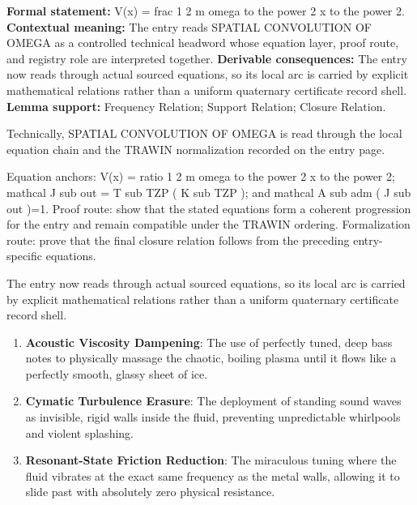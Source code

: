 \begingroup\footnotesize\setlength{\emergencystretch}{3em}\sloppy
\textbf{Formal statement:} V(x) = frac 1 2 m omega to the power 2 x to the power 2. \textbf{Contextual meaning:} The entry reads SPATIAL CONVOLUTION OF OMEGA as a controlled technical headword whose equation layer, proof route, and registry role are interpreted together. \textbf{Derivable consequences:} The entry now reads through actual sourced equations, so its local arc is carried by explicit mathematical relations rather than a uniform quaternary certificate record shell. \textbf{Lemma support:} Frequency Relation; Support Relation; Closure Relation.\par
\endgroup

Technically, SPATIAL CONVOLUTION OF OMEGA is read through the local equation chain and the TRAWIN normalization recorded on the entry page.

Equation anchors: V(x) = ratio 1 2 m omega to the power 2 x to the power 2; mathcal J sub out = T sub TZP ( K sub TZP ); and mathcal A sub adm ( J sub out )=1. Proof route: show that the stated equations form a coherent progression for the entry and remain compatible under the TRAWIN ordering. Formalization route: prove that the final closure relation follows from the preceding entry-specific equations.

The entry now reads through actual sourced equations, so its local arc is carried by explicit mathematical relations rather than a uniform quaternary certificate record shell.
\endgroup

\begin{enumerate}[leftmargin=1.6em,itemsep=6pt,topsep=4pt]
\item \textbf{Acoustic Viscosity Dampening}: The use of perfectly tuned, deep bass notes to physically massage the chaotic, boiling plasma until it flows like a perfectly smooth, glassy sheet of ice.
\item \textbf{Cymatic Turbulence Erasure}: The deployment of standing sound waves as invisible, rigid walls inside the fluid, preventing unpredictable whirlpools and violent splashing.
\item \textbf{Resonant-State Friction Reduction}: The miraculous tuning where the fluid vibrates at the exact same frequency as the metal walls, allowing it to slide past with absolutely zero physical resistance.
\end{enumerate}

